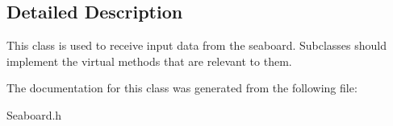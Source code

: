 \subsection{Detailed Description}
This class is used to receive input data from the seaboard. Subclasses should implement the virtual methods that are relevant to them. 

The documentation for this class was generated from the following file\-:\begin{DoxyCompactItemize}
\item 
Seaboard.\-h\end{DoxyCompactItemize}
